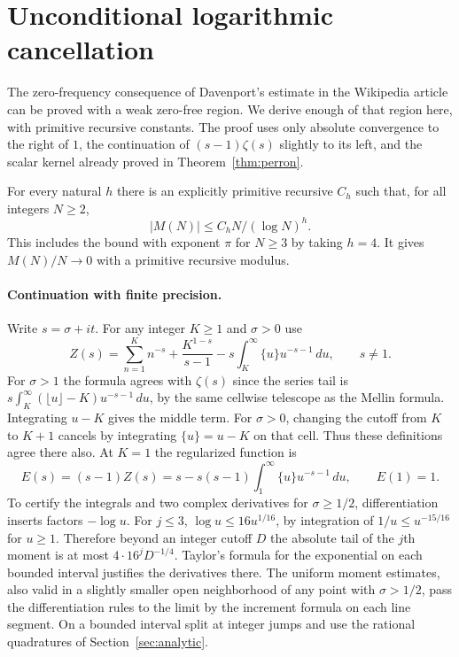 \section{Unconditional logarithmic cancellation}\label{sec:logrates}

The zero-frequency consequence of Davenport's estimate in the Wikipedia
article can be proved with a weak zero-free region. We derive enough of that
region here, with primitive recursive constants. The proof uses only
absolute convergence to the right of $1$, the continuation of
$(s-1)\zeta(s)$ slightly to its left, and the scalar kernel already
proved in Theorem~\ref{thm:perron}.

\begin{theorem}\label{thm:unconditional-log}
For every natural $h$ there is an explicitly primitive recursive $C_h$
such that, for all integers $N\ge2$,
\[
                    |M(N)|\le C_h N/(\log N)^h .
\]
This includes the bound with exponent $\pi$ for $N\ge3$ by taking
$h=4$. It gives $M(N)/N\to0$ with a primitive recursive modulus.
\end{theorem}

\paragraph{Continuation with finite precision.}
Write $s=\sigma+it$. For any integer $K\ge1$ and $\sigma>0$ use
\begin{equation}\label{eq:zetacut}
 Z(s)=\sum_{n=1}^K n^{-s}+\frac{K^{1-s}}{s-1}
            -s\int_K^\infty \{u\}u^{-s-1}\,du,\qquad s\ne1.
\end{equation}
For $\sigma>1$ the formula agrees with $\zeta(s)$ since the series tail is
$s\int_K^\infty(\lfloor u\rfloor-K)u^{-s-1}\,du$, by the same
cellwise telescope as the Mellin formula. Integrating $u-K$
gives the middle term. For $\sigma>0$, changing the cutoff from $K$
to $K+1$ cancels by integrating $\{u\}=u-K$ on that cell. Thus
these definitions agree there also. At $K=1$ the regularized function is
\[
 E(s)=(s-1)Z(s)=s-s(s-1)\int_1^\infty\{u\}u^{-s-1}\,du,
 \qquad E(1)=1 .
\]
To certify the integrals and two complex derivatives for
$\sigma\ge1/2$, differentiation inserts factors $-\log u$.
For $j\le3$, $\log u\le16u^{1/16}$, by integration of
$1/u\le u^{-15/16}$ for $u\ge1$. Therefore beyond an integer cutoff
$D$ the absolute tail of the $j$th moment is at most
$4\cdot16^j D^{-1/4}$. Taylor's formula for the exponential on
each bounded interval justifies the derivatives there. The uniform
moment estimates, also valid in a slightly smaller open neighborhood
of any point with $\sigma>1/2$, pass the differentiation rules to the
limit by the increment formula on each line segment. On a bounded
interval split at integer jumps and use the rational quadratures of
Section~\ref{sec:analytic}.

